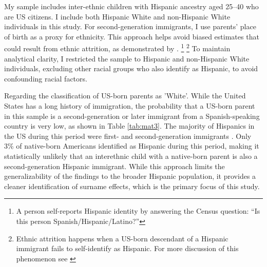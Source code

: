 My sample includes inter-ethnic children with Hispanic ancestry aged 25–40 who are US citizens. I include both Hispanic White and non-Hispanic White individuals in this study. For second-generation immigrants, I use parents' place of birth as a proxy for ethnicity. This approach helps avoid biased estimates that could result from ethnic attrition, as demonstrated by \textcite{hadah2024effect}. \footnote{A person self-reports Hispanic identity by answering the Census question: ``Is this person Spanish/Hispanic/Latino?''} \footnote{Ethnic attrition happens when a US-born descendant of a Hispanic immigrant fails to self-identify as Hispanic. For more discussion of this phenomenon see \textcite{antmanEthnicAttritionObserved2016,antmanEthnicAttritionAssimilation2020}} To maintain analytical clarity, I restricted the sample to Hispanic and non-Hispanic White individuals, excluding other racial groups who also identify as Hispanic, to avoid confounding racial factors.

Regarding the classification of US-born parents as 'White'. While the United States has a long history of immigration, the probability that a US-born parent in this sample is a second-generation or later immigrant from a Spanish-speaking country is very low, as shown in Table \ref{tab:mat3}. The majority of Hispanics in the US during this period were first- and second-generation immigrants \autocite{antmanEthnicAttritionAssimilation2020}. Only 3\% of native-born Americans identified as Hispanic during this period, making it statistically unlikely that an interethnic child with a native-born parent is also a second-generation Hispanic immigrant. While this approach limits the generalizability of the findings to the broader Hispanic population, it provides a cleaner identification of surname effects, which is the primary focus of this study.

